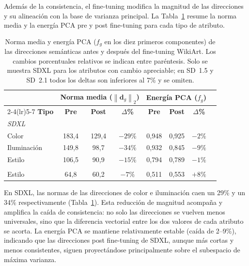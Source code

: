 \documentclass[12pt, a4paper, twoside]{book}
\newcommand{\norm}[1]{\left\|#1\right\|_2}
\begin{document}
Además de la consistencia, el fine-tuning modifica la magnitud de las direcciones y su
alineación con la base de varianza principal. La Tabla~\ref{tab:deriva_normas_energia}
resume la norma media y la energía PCA pre y post fine-tuning para cada tipo de atributo.

\begin{table}[htb]
\centering
\caption{Norma media y energía PCA ($f_g$ en los diez primeros componentes) de las
direcciones semánticas antes y después del fine-tuning WikiArt. Los cambios porcentuales
relativos se indican entre paréntesis. Solo se muestra SDXL para los atributos con cambio
apreciable; en SD~1.5 y SD~2.1 todos los deltas son inferiores al 7\% y se omiten.}
\label{tab:deriva_normas_energia}
\small
\begin{tabular}{lccccccc}
\toprule
 & \multicolumn{3}{c}{\textbf{Norma media ($\norm{\mathbf{d}_g}$)}} &
\multicolumn{3}{c}{\textbf{Energía PCA ($f_g$)}} \\
\cmidrule(lr){2-4}\cmidrule(lr){5-7}
\textbf{Tipo} & \textbf{Pre} & \textbf{Post} & \textbf{$\Delta$\%} &
\textbf{Pre} & \textbf{Post} & \textbf{$\Delta$\%} \\
\midrule
\multicolumn{7}{l}{\textit{SDXL}} \\
Color       & 183,4 & 129,4 & $-29\%$ & 0,948 & 0,925 & $-2\%$ \\
Iluminación & 149,8 & \phantom{1}98,7 & $-34\%$ & 0,932 & 0,845 & $-9\%$ \\
Estilo      & 106,5 & \phantom{1}90,9 & $-15\%$ & 0,794 & 0,789 & $-1\%$ \\
\addlinespace
\multicolumn{7}{l}{\textit{SD~2.1} (referencia)} \\
Estilo      & \phantom{1}64,8 & \phantom{1}60,2 & $-7\%$ & 0,511 & 0,553 & $+8\%$ \\
\bottomrule
\end{tabular}
\end{table}

En SDXL, las normas de las direcciones de color e iluminación caen un 29\% y un 34\%
respectivamente (Tabla~\ref{tab:deriva_normas_energia}). Esta reducción de magnitud acompaña
y amplifica la caída de consistencia: no solo las direcciones se vuelven menos universales,
sino que la diferencia vectorial entre los dos valores de cada atributo se acorta. La energía PCA
se mantiene relativamente estable (caída de 2--9\%), indicando que las direcciones post
fine-tuning de SDXL, aunque más cortas y menos consistentes, siguen proyectándose
principalmente sobre el subespacio de máxima varianza.
\end{document}
